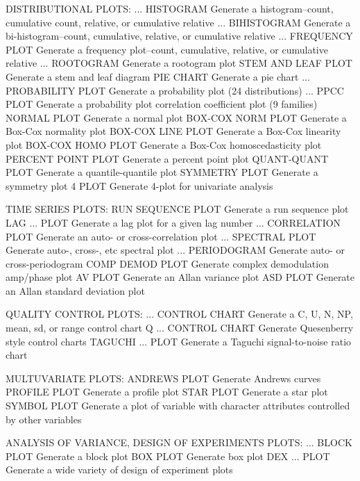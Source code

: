 DISTRIBUTIONAL PLOTS:
   ... HISTOGRAM         Generate a histogram--count, cumulative count,
                         relative, or cumulative relative
   ... BIHISTOGRAM       Generate a bi-histogram--count, cumulative,
                         relative, or cumulative relative
   ... FREQUENCY PLOT    Generate a frequency plot--count, cumulative,
                         relative, or cumulative relative
   ... ROOTOGRAM         Generate a rootogram plot
   STEM AND LEAF PLOT    Generate a stem and leaf diagram
   PIE CHART             Generate a pie chart
   ... PROBABILITY PLOT  Generate a probability plot (24 distributions)
   ... PPCC PLOT         Generate a probability plot correlation
                         coefficient plot (9 families)
   NORMAL PLOT           Generate a normal plot
   BOX-COX NORM PLOT     Generate a Box-Cox normality plot
   BOX-COX LINE PLOT     Generate a Box-Cox linearity plot
   BOX-COX HOMO PLOT     Generate a Box-Cox homoscedasticity plot
   PERCENT POINT PLOT    Generate a percent point plot
   QUANT-QUANT PLOT      Generate a quantile-quantile plot
   SYMMETRY PLOT         Generate a symmetry plot
   4 PLOT                Generate 4-plot for univariate analysis
 
TIME SERIES PLOTS:
   RUN SEQUENCE PLOT     Generate a run sequence plot
   LAG ... PLOT          Generate a lag plot for a given lag number
   ... CORRELATION PLOT  Generate an auto- or cross-correlation plot
   ... SPECTRAL PLOT     Generate auto-, cross-, etc spectral plot
   ... PERIODOGRAM       Generate auto- or cross-periodogram
   COMP DEMOD PLOT       Generate complex demodulation amp/phase plot
   AV PLOT               Generate an Allan variance plot
   ASD PLOT              Generate an Allan standard deviation plot
 
QUALITY CONTROL PLOTS:
   ... CONTROL CHART     Generate a C, U, N, NP, mean, sd, or range
                         control chart
   Q ... CONTROL CHART   Generate Quesenberry style control charts
   TAGUCHI ... PLOT      Generate a Taguchi signal-to-noise ratio chart
 
MULTUVARIATE PLOTS:
   ANDREWS PLOT          Generate Andrews curves
   PROFILE PLOT          Generate a profile plot
   STAR PLOT             Generate a star plot
   SYMBOL PLOT           Generate a plot of variable with character
                         attributes controlled by other variables
 
ANALYSIS OF VARIANCE, DESIGN OF EXPERIMENTS PLOTS:
   ... BLOCK PLOT        Generate a block plot
   BOX PLOT              Generate box plot
   DEX ... PLOT          Generate a wide variety of design of
                         experiment plots
 

